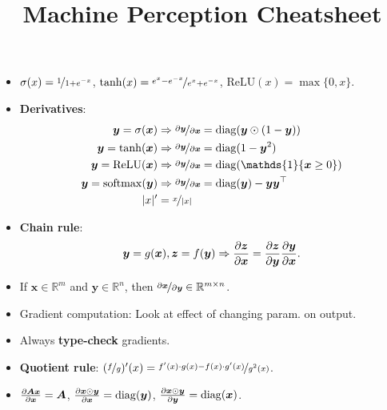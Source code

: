 \documentclass{article}
\title{Machine Perception Cheatsheet}
\newcommand{\R}{\mathbb{R}}
\renewcommand{\vec}[1]{\bm{#1}}
\newcommand{\mat}[1]{\bm{#1}}
\begin{document}
\setlength{\columnsep}{0.15cm}


\begin{multicols*}{2}

    \begin{itemize}
        \item $\sigma(x) = \nicefrac{1}{1 + e^{-x}}$, $\tanh(x) = \nicefrac{e^x - e^{-x}}{e^x + e^{-x}}$, $\mathrm{ReLU}(x) = \max\{ 0,x \}$.
        \item \textbf{Derivatives}:
              \begin{align*}
                  \vec{y} = \sigma(\vec{x})           & \Rightarrow \nicefrac{\partial \vec{y}}{\partial \vec{x}} = \mathrm{diag}(\vec{y} \odot (1 - \vec{y}))    \\
                  \vec{y} = \tanh(\vec{x})            & \Rightarrow \nicefrac{\partial \vec{y}}{\partial \vec{x}} = \mathrm{diag}(1 - \vec{y}^2)                  \\
                  \vec{y} = \mathrm{ReLU}(\vec{x})    & \Rightarrow \nicefrac{\partial \vec{y}}{\partial \vec{x}} = \mathrm{diag}(\mathds{1}\{ \vec{x} \geq 0 \}) \\
                  \vec{y} = \mathrm{softmax}(\vec{y}) & \Rightarrow \nicefrac{\partial \vec{y}}{\partial \vec{x}} = \mathrm{diag}(\vec{y}) - \vec{y} \vec{y}^\top \\
                  |x|'                                & = \nicefrac{x}{|x|}                                                                                       \\
              \end{align*}
        \item \textbf{Chain rule}: \[
                  \vec{y} = g(\vec{x}), \vec{z} = f(\vec{y}) \Rightarrow \pdv{\vec{z}}{\vec{x}} = \pdv{\vec{z}}{\vec{y}} \pdv{\vec{y}}{\vec{x}}.
              \]

        \item If $\vec{x} \in \R^{m}$ and $\vec{y} \in \R^{n}$, then $\nicefrac{\partial \vec{x}}{\partial
                      \vec{y}} \in \R^{m\times n}$.
        \item Gradient computation: Look at effect of changing param. on output.
        \item Always \textbf{type-check} gradients.
        \item \textbf{Quotient rule}: $(\nicefrac{f}{g})'(x) = \nicefrac{f'(x)\cdot g(x) - f(x)\cdot g'(x)}{g^2(x)}$.
        \item $\pdv{\mat{A} \vec{x}}{\vec{x}} = \mat{A}$, $\pdv{\vec{x} \odot \vec{y}}{\vec{x}} = \mathrm{diag}(\vec{y})$, $\pdv{\vec{x} \odot \vec{y}}{\vec{y}} = \mathrm{diag}(\vec{x})$.


\end{itemize}
\end{multicols*}
\end{document}
